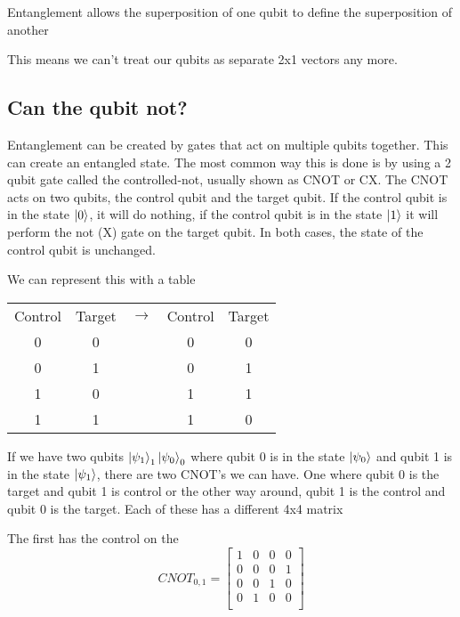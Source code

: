 \documentclass{book}
\begin{document}
Entanglement allows the superposition of one qubit to define the superposition of another

This means we can't treat our qubits as separate 2x1 vectors any more. 


\subsection{ Can the qubit not? }

Entanglement can be created by gates that act on multiple qubits together. This can create an entangled state. The most common way this is done is by using a 2 qubit gate called the controlled-not, usually shown as CNOT or CX. The CNOT acts on two qubits, the control qubit and the target qubit. If the control qubit is in the state $\ket{0}$, it will do nothing, if the control qubit is in the state $\ket{1}$ it will perform the not (X) gate on the target qubit. In both cases, the state of the control qubit is unchanged. 

We can represent this with a table

\begin{center}
\begin{tabular}{ | c | c | c | c | c |}

 Control & Target & $\rightarrow{}$ & Control & Target \\ 
  
 0 & 0 &  & 0 & 0 \\ 
 
 0 & 1 &  & 0 & 1 \\
 
 1 & 0 &  & 1 & 1 \\
 
 1 & 1 &  & 1 & 0 \\
 
  
\end{tabular}
\end{center}

If we have two qubits $\ket{\psi_1}_1\ket{\psi_0}_0$ where qubit 0 is in the state $\ket{\psi_0}$ and qubit 1 is in the state $\ket{\psi_1}$, there are two CNOT's we can have. One where qubit 0 is the target and qubit 1 is control or the other way around, qubit 1 is the control and qubit 0 is the target. Each of these has a different 4x4 matrix


The first has the control on the 
$$
CNOT_{0, 1} = \begin{bmatrix} 1 & 0 & 0 & 0 \\
0 & 0 & 0 & 1 \\
0 & 0 & 1 & 0 \\
0 & 1 & 0 & 0 \\
\end{bmatrix}
$$
\end{document}
